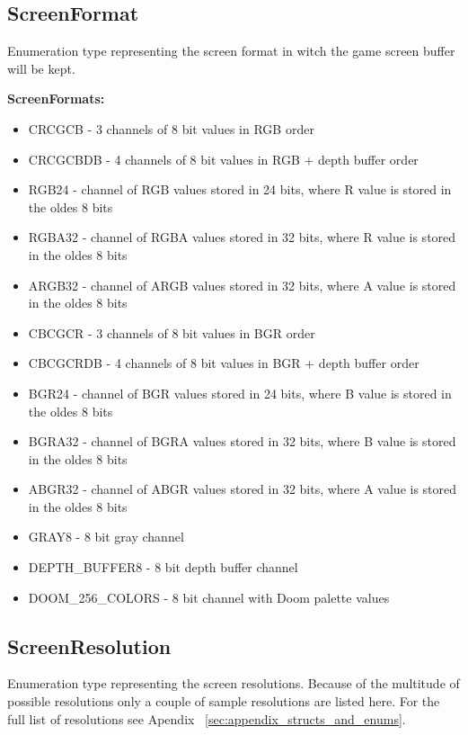 \subsection{ScreenFormat}\label{subsec:screenformat}
	Enumeration type representing the screen format in witch the game screen buffer will be kept. 


\vspace{20pt}
\textbf{ScreenFormats:}
\begin{itemize}
 \item CRCGCB - 3 channels of 8 bit values in RGB order
 \item CRCGCBDB - 4 channels of 8 bit values in RGB + depth buffer order
 \item RGB24 - channel of RGB values stored in 24 bits, where R value is stored in the oldes 8 bits
 \item RGBA32 - channel of RGBA values stored in 32 bits, where R value is stored in the oldes 8 bits
 \item ARGB32 - channel of ARGB values stored in 32 bits, where A value is stored in the oldes 8 bits
 \item CBCGCR - 3 channels of 8 bit values in BGR order
 \item CBCGCRDB - 4 channels of 8 bit values in BGR + depth buffer order
 \item BGR24 - channel of BGR values stored in 24 bits, where B value is stored in the oldes 8 bits
 \item BGRA32 - channel of BGRA values stored in 32 bits, where B value is stored in the oldes 8 bits 
 \item ABGR32 - channel of ABGR values stored in 32 bits, where A value is stored in the oldes 8 bits
 \item GRAY8 - 8 bit gray channel
 \item DEPTH\_BUFFER8 - 8 bit depth buffer channel
 \item DOOM\_256\_COLORS - 8 bit channel with Doom palette values
\end{itemize}
\subsection{ScreenResolution} \label{subsec:screenresolution}

	Enumeration type representing the screen resolutions. Because of the multitude of possible resolutions only a couple of sample resolutions are listed here. For the full list of resolutions see Apendix ~\ref{sec:appendix_structs_and_enums}.


